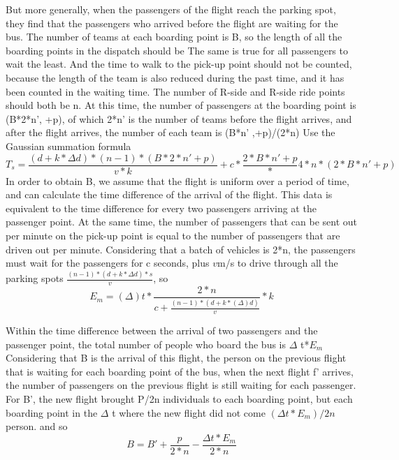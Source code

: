But more generally, when the passengers of the flight reach the parking spot, they find that the passengers who arrived before the flight are waiting for the bus. The number of teams at each boarding point is B, so the length of all the boarding points in the dispatch should be The same is true for all passengers to wait the least. And the time to walk to the pick-up point should not be counted, because the length of the team is also reduced during the past time, and it has been counted in the waiting time. The number of R-side and R-side ride points should both be n. At this time, the number of passengers at the boarding point is (B*2*n', +p), of which 2*n' is the number of teams before the flight arrives, and after the flight arrives, the number of each team is (B*n' ,+p)/(2*n) 
Use the Gaussian summation formula
\begin{equation} T_{s} = \frac{{(d+k*\Delta d)}*{(n-1)}*{(B*2*n'+p)}}{v*k}+c*\frac{2*B*n'+p}*{4*n}*{(2*B*n'+p)}\end{equation}
\indent In order to obtain B, we assume that the flight is uniform over a period of time, and can calculate the time difference of the arrival of the flight. This data is equivalent to the time difference for every two passengers arriving at the passenger point. At the same time, the number of passengers that can be sent out per minute on the pick-up point is equal to the number of passengers that are driven out per minute. Considering that a batch of vehicles is 2*n, the passengers must wait for the passengers for c seconds, plus $v$m/s to drive
through all the parking spots $\frac{(n-1)*(d+k*\Delta d)*s}{v}$, so
\begin{equation} E_{m} =(\Delta) t*\frac{2*n}{c+\frac{(n-1)*(d+k*(\Delta) d)}{v}}*k \end{equation}

Within the time difference between the arrival of two passengers and the passenger point, the total number of people who board the bus is $\Delta$ t*$E_m$
Considering that B is the arrival of this flight, the person on the previous flight that is waiting for each boarding point of the bus, when the next flight f' arrives, the number of passengers on the previous flight is still waiting for each passenger. For B', the new flight brought P/2n individuals to each boarding point, but each boarding point in the $\Delta$ t where the new flight did not come $(\Delta t*E_m)/2n$ person.
and so
\begin{equation} B =B'+\frac{p}{2*n}-\frac{\Delta t*E_m}{2*n} \end{equation}

